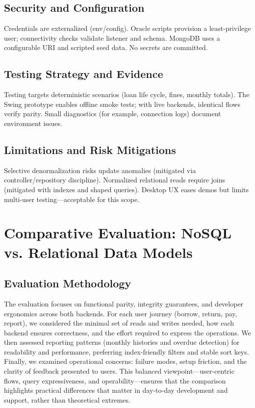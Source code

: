 \documentclass[12pt,a4paper]{article}
\begin{document}
\subsection{Security and Configuration}

Credentials are externalized (env/config). Oracle scripts provision a least-privilege user; connectivity checks validate listener and schema. MongoDB uses a configurable URI and scripted seed data. No secrets are committed.

\subsection{Testing Strategy and Evidence}

Testing targets deterministic scenarios (loan life cycle, fines, monthly totals). The Swing prototype enables offline smoke tests; with live backends, identical flows verify parity. Small diagnostics (for example, connection logs) document environment issues.

\subsection{Limitations and Risk Mitigations}

Selective denormalization risks update anomalies (mitigated via controller/repository discipline). Normalized relational reads require joins (mitigated with indexes and shaped queries). Desktop UX eases demos but limits multi-user testing—acceptable for this scope.

\section{Comparative Evaluation: NoSQL vs. Relational Data Models}

\subsection{Evaluation Methodology}

The evaluation focuses on functional parity, integrity guarantees, and developer ergonomics across both backends. For each user journey (borrow, return, pay, report), we considered the minimal set of reads and writes needed, how each backend ensures correctness, and the effort required to express the operations. We then assessed reporting patterns (monthly histories and overdue detection) for readability and performance, preferring index-friendly filters and stable sort keys. Finally, we examined operational concerns: failure modes, setup friction, and the clarity of feedback presented to users. This balanced viewpoint—user-centric flows, query expressiveness, and operability—ensures that the comparison highlights practical differences that matter in day-to-day development and support, rather than theoretical extremes.
\end{document}
